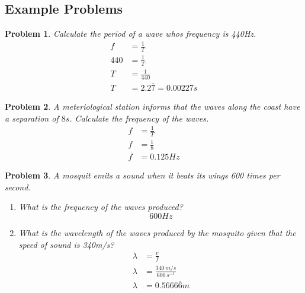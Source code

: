 \subsection{Example Problems}
\newtheorem{waveexamples}{Problem}
\begin{waveexamples}
    Calculate the period of a wave whos frequency is 440Hz.
\[ 
    \begin{aligned}
        f & = \frac{1}{T} \\
        440 & = \frac{1}{T} \\
        T & = \frac{1}{440} \\
        T & = 2.2\overline{7} = 0.00227s
    \end{aligned}
\]
\end{waveexamples}
\begin{waveexamples}
   A meteriological station informs that the waves along the coast have a separation of \(8s\). Calculate the frequency of the waves.
\[
    \begin{aligned}
        f & = \frac{1}{T} \\
        f & = \frac{1}{8} \\
        f & = 0.125Hz
    \end{aligned}
\]
\end{waveexamples}
\begin{waveexamples}
A mosquit emits a sound when it beats its wings 600 times per second.
\begin{enumerate}[label=(\alph*)]
    \item What is the frequency of the waves produced? \[600Hz\]
    \item What is the wavelength of the waves produced by the mosquito given that the speed of sound is 340m/s? \[\begin{aligned}\lambda & = \frac{v}{f} \\\lambda & = \frac{340\, m/s}{600\, s^{-1}}\\\lambda & = 0.5666\overline{6}m\end{aligned}\]
    \end{enumerate}
 \end{waveexamples}